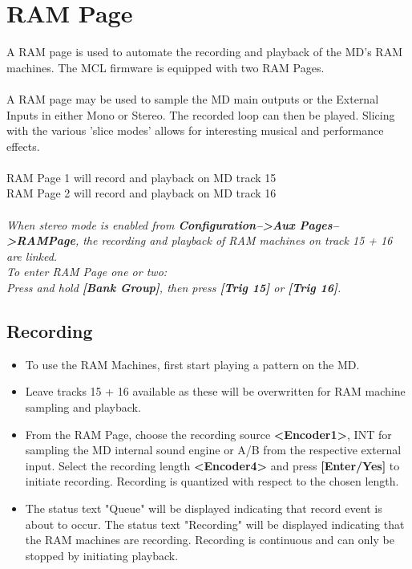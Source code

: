 \chapter{RAM Page}
A RAM page is used to automate the recording and playback of the MD's RAM machines. The MCL firmware is equipped with two RAM Pages.
\\\\
A RAM page may be used to sample the MD main outputs or the External Inputs in either Mono or Stereo. The recorded loop can then be played.
Slicing with the various 'slice modes' allows for interesting musical and performance effects.
\\\\
RAM Page 1 will record and playback on MD track 15\\
RAM Page 2 will record and playback on MD track 16\\
\\
\textit{When stereo mode is enabled from \textbf{Configuration-->Aux Pages-->RAMPage}, the recording and playback of RAM machines on track 15 + 16 are linked.}
\\
\textit{To enter RAM Page one or two: \\Press and hold
\textbf{[Bank Group]}, then press \textbf{[Trig 15]} or \textbf{[Trig 16]}.}

\newpage
\section{Recording}
\begin{itemize}
    \item{To use the RAM Machines, first start playing a pattern on the MD.}
    \item{Leave tracks 15 + 16 available as these will be overwritten for RAM machine sampling and playback.}
    \item{From the RAM Page, choose the recording source \textbf{<Encoder1>}, INT for sampling the MD internal sound engine or A/B from the respective external input. Select the recording length \textbf{<Encoder4>} and press \textbf{[Enter/Yes]} to initiate recording. Recording is quantized with respect to the chosen length.}
    \item The status text "Queue" will be displayed indicating that record event is about to occur. The status text "Recording" will be displayed indicating that the RAM machines are recording. Recording is continuous and can only be stopped by initiating playback.
\end{itemize}

